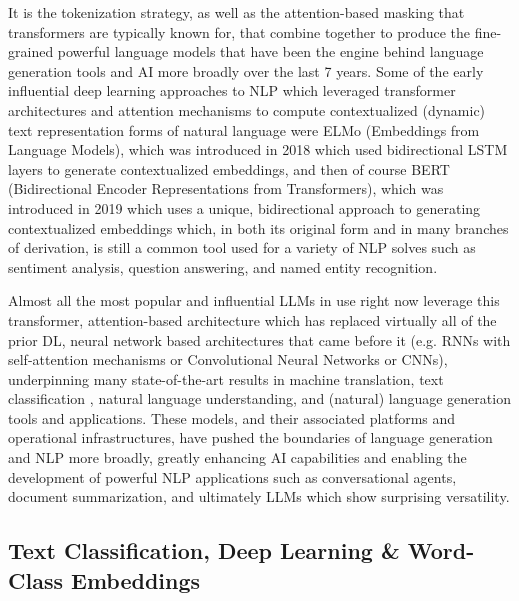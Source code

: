 \documentclass[final]{clv2025-revised}
\begin{document}
It is the tokenization strategy, as well as the attention-based masking that transformers are typically known for, that combine together to produce the fine-grained powerful language models that have been the engine behind language generation tools and AI more broadly over the last 7 years. Some of the early influential deep learning approaches to NLP which leveraged transformer architectures and attention mechanisms to compute contextualized (dynamic) text representation forms of natural language were ELMo (Embeddings from Language Models), which was introduced in 2018 \cite{peters2018deep} which used bidirectional LSTM layers to generate contextualized embeddings, and then of course BERT (Bidirectional Encoder Representations from Transformers), which was introduced in 2019 \cite{devlin-etal-2019-bert} which uses a unique, bidirectional approach to generating contextualized embeddings which, in both its original form and in many branches of derivation, is still a common tool used for a variety of NLP solves such as sentiment analysis, question answering, and named entity recognition. 

Almost all the most popular and influential LLMs in use right now leverage this transformer, attention-based architecture which has replaced virtually all of the prior DL, neural network based architectures that came before it (e.g. RNNs with self-attention mechanisms or Convolutional Neural Networks or CNNs), underpinning many state-of-the-art results in machine translation, text classification \cite{devlin-etal-2019-bert}, natural language understanding, and (natural) language generation tools \cite{radford2019language} and applications. These models, and their associated platforms and operational infrastructures, have pushed the boundaries of language generation and NLP more broadly, greatly enhancing AI capabilities and enabling the development of powerful NLP applications such as conversational agents, document summarization, and ultimately LLMs which show surprising versatility.

\subsection{Text Classification, Deep Learning \& Word-Class Embeddings}
\end{document}
